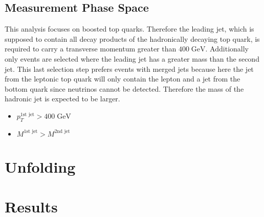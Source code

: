 \subsection{Measurement Phase Space}
\label{sec:FinalSel}
	This analysis focuses on boosted top quarks. Therefore the leading jet, which is supposed to contain all decay products of the hadronically decaying top quark, is required to carry a transverse momentum greater than $400\;\text{GeV}$. Additionally only events are selected where the leading jet has a greater mass than the second jet. This last selection step prefers events with merged jets because here the jet from the leptonic top quark will only contain the lepton and a jet from the bottom quark since neutrinos cannot be detected. Therefore the mass of the hadronic jet is expected to be larger.
	\begin{itemize}
	\item $p_T^{\text{1st jet}} > 400\;\text{GeV}$ 
	\item $M^{\text{1st jet}} > M^{\text{2nd jet}}$
	\end{itemize}

\section{Unfolding}
\section{Results}
\label{sex:results}